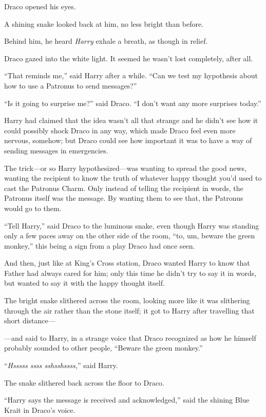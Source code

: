 Draco opened his eyes.

A shining snake looked back at him, no less bright than before.

Behind him, he heard \emph{Harry} exhale a breath, as though in relief.

Draco gazed into the white light. It seemed he wasn’t lost completely, after all.

“That reminds me,” said Harry after a while. “Can we test my hypothesis about how to use a Patronus to send messages?”

“Is it going to surprise me?” said Draco. “I don’t want any more surprises today.”

\later

Harry had claimed that the idea wasn’t all that strange and he didn’t see how it could possibly shock Draco in any way, which made Draco feel even more nervous, somehow; but Draco could see how important it was to have a way of sending messages in emergencies.

The trick—or so Harry hypothesized—was wanting to spread the good news, wanting the recipient to know the truth of whatever happy thought you’d used to cast the Patronus Charm. Only instead of telling the recipient in words, the Patronus itself was the message. By wanting them to see that, the Patronus would go to them.

“Tell Harry,” said Draco to the luminous snake, even though Harry was standing only a few paces away on the other side of the room, “to, um, beware the green monkey,” this being a sign from a play Draco had once seen.

And then, just like at King’s Cross station, Draco wanted Harry to know that Father had always cared for him; only this time he didn’t try to say it in words, but wanted to say it with the happy thought itself.

The bright snake slithered across the room, looking more like it was slithering through the air rather than the stone itself; it got to Harry after travelling that short distance—

—and said to Harry, in a strange voice that Draco recognized as how he himself probably sounded to other people, “Beware the green monkey.”

“\emph{Hsssss ssss sshsshssss,}” said Harry.

The snake slithered back across the floor to Draco.

“Harry says the message is received and acknowledged,” said the shining Blue Krait in Draco’s voice.

